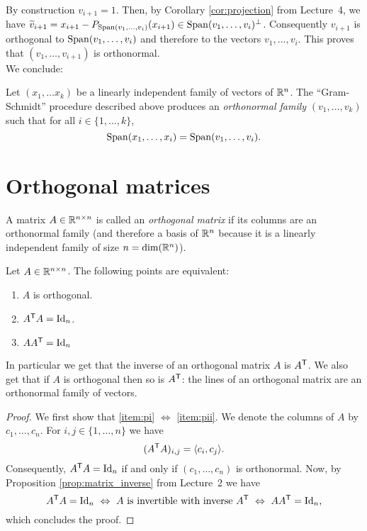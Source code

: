 \documentclass[11pt,nocut]{article}
\begin{document}
By construction $v_{i+1} = 1$. 
Then, by Corollary \ref{cor:projection} from Lecture~4, we have $\widetilde{v}_{i+1} = x_{i+1} - P_{{{\rm Span}}(v_1, \dots, v_i)}(x_{i+1}) \in {{\rm Span}}(v_1, \dots, v_i)^{\perp}$. Consequently $v_{i+1}$ is orthogonal to ${{\rm Span}}(v_1, \dots, v_i)$ and therefore to the vectors $v_1, \dots, v_i$. This proves that $(v_1, \dots, v_{i+1})$ is orthonormal.
\\

We conclude:

\begin{theorem}\label{th:gram_schmidt}
	Let $(x_1, \dots x_k)$ be a linearly independent family of vectors of $\mathbb{R}^n$. The ``Gram-Schmidt'' procedure described above produces an \emph{orthonormal family} $(v_1, \dots, v_k)$ such that for all $i \in \{1, \dots, k\}$,
	$$
	{{\rm Span}}(x_1, \dots, x_i) = {{\rm Span}}(v_1, \dots, v_i).
	$$
\end{theorem}

\section{Orthogonal matrices}

\begin{definition}
	A matrix $A \in \mathbb{R}^{n \times n}$ is called an \emph{orthogonal matrix} if its columns are an orthonormal family (and therefore a basis of $\mathbb{R}^n$ because it is a linearly independent family of size $n = {{\rm dim}}(\mathbb{R}^n)$).
\end{definition}

\begin{proposition}\label{prop:equiv_orthogonal}
	Let $A \in \mathbb{R}^{n \times n}$. The following points are equivalent:
	\begin{enumerate}[label=(\roman*)]
		\item \label{item:pi} $A$ is orthogonal.
		\item \label{item:pii} $A^{{\sf T}} A = {{\rm Id}}_n$.
		\item \label{item:piii} $A A^{{\sf T}} = {{\rm Id}}_n$
	\end{enumerate}
\end{proposition}
In particular we get that the inverse of an orthogonal matrix $A$ is $A^{{\sf T}}$. We also get that if $A$ is orthogonal then so is $A^{{\sf T}}$: the lines of an orthogonal matrix are an orthonormal family of vectors.
\\

\begin{proof}
	We first show that \ref{item:pi} $\Leftrightarrow$ \ref{item:pii}. We denote the columns of $A$ by $c_1, \dots, c_n$. For $i,j \in \{1 ,\dots, n \}$ we have
	$$
	(A^{{\sf T}}A)_{i,j} = \langle c_i, c_j \rangle.
	$$
	Consequently, $A^{{\sf T}} A = {{\rm Id}}_n$ if and only if $(c_1, \dots, c_n)$ is orthonormal. 
	Now, by Proposition \ref{prop:matrix_inverse} from Lecture~2 we have
	$$
		A^{{\sf T}} A = {{\rm Id}}_n
		\ \Leftrightarrow \
		A \ \text{is invertible with inverse} \ A^{{\sf T}}
		\ \Leftrightarrow \
		A A^{{\sf T}} = {{\rm Id}}_n,
	$$
	which concludes the proof.
\end{proof}
\end{document}

